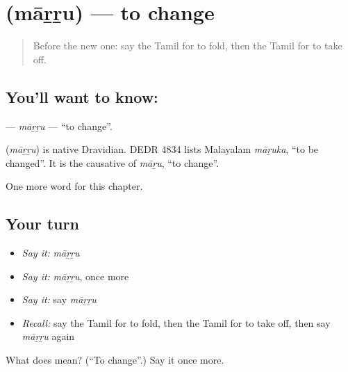 \section[\texorpdfstring{\ta{மாற்று} (māṟṟu)}{மாற்று (māṟṟu)}]{ (māṟṟu) — to change}

\label{lesson:TA-C225-marru}



\begin{quote}
Before the new one: say the Tamil for to fold, then the Tamil for to take off.
\end{quote}

\subsection*{You'll want to know: }
\textbf{} — \emph{māṟṟu} — \textquotedblleft{}to change\textquotedblright{}.

\begin{cousinweb}
\textbf{} (\emph{māṟṟu}) is native Dravidian. DEDR 4834 lists Malayalam \emph{māṟuka}, \textquotedblleft{}to be changed\textquotedblright{}. It is the causative of \emph{māṟu}, \textquotedblleft{}to change\textquotedblright{}.
\end{cousinweb}

\begin{grammarlens}[title={What you've built}]
One more word for this chapter.
\end{grammarlens}

\subsection*{Your turn}
\begin{itemize}
\raggedright
  \item \emph{Say it:} \emph{māṟṟu}
  \item \emph{Say it:} \emph{māṟṟu}, once more
  \item \emph{Say it:} say \emph{māṟṟu}
  \item \emph{Recall:} say the Tamil for to fold, then the Tamil for to take off, then say \emph{māṟṟu} again
\end{itemize}

\begin{tcolorbox}[breakable,colback=teal!4,colframe=teal!35!black,title={Before you move on}]
What does  mean? (\textquotedblleft{}To change\textquotedblright{}.) Say it once more.
\end{tcolorbox}
